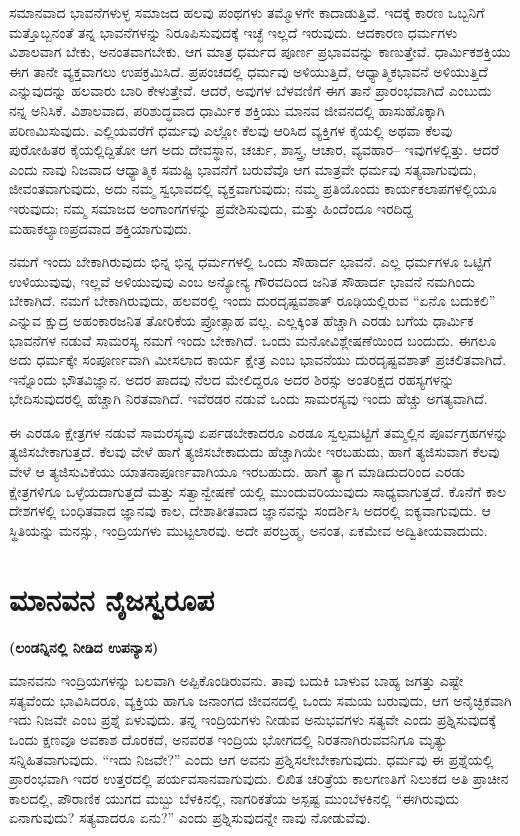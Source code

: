 ಸಮಾನವಾದ ಭಾವನೆಗಳುಳ್ಳ ಸಮಾಜದ ಹಲವು ಪಂಥಗಳು ತಮ್ಮೊಳಗೇ ಕಾದಾಡುತ್ತಿವೆ. ಇದಕ್ಕೆ ಕಾರಣ ಒಬ್ಬನಿಗೆ ಮತ್ತೊಬ್ಬನಂತೆ ತನ್ನ ಭಾವನೆಗಳನ್ನು ನಿರೂಪಿಸುವುದಕ್ಕೆ ಇಚ್ಛೆ ಇಲ್ಲದೆ ಇರುವುದು. ಆದಕಾರಣ ಧರ್ಮಗಳು ವಿಶಾಲವಾಗ ಬೇಕು, ಅನಂತವಾಗಬೇಕು. ಆಗ ಮಾತ್ರ ಧರ್ಮದ ಪೂರ್ಣ ಪ್ರಭಾವವನ್ನು ಕಾಣುತ್ತೇವೆ. ಧಾರ್ಮಿಕಶಕ್ತಿಯು ಈಗ ತಾನೇ ವ್ಯಕ್ತವಾಗಲು ಉಪಕ್ರಮಿಸಿದೆ. ಪ್ರಪಂಚದಲ್ಲಿ ಧರ್ಮವು ಅಳಿಯುತ್ತಿದೆ, ಆಧ್ಯಾತ್ಮಿಕಭಾವನೆ ಅಳಿಯುತ್ತಿದೆ ಎನ್ನುವುದನ್ನು ಹಲವಾರು ಬಾರಿ ಕೇಳುತ್ತೇವೆ. ಆದರೆ, ಅವುಗಳ ಬೆಳವಣಿಗೆ ಈಗ ತಾನೆ ಪ್ರಾರಂಭವಾಗಿದೆ ಎಂಬುದು ನನ್ನ ಅನಿಸಿಕೆ. ವಿಶಾಲವಾದ, ಪರಿಶುದ್ಧವಾದ ಧಾರ್ಮಿಕ ಶಕ್ತಿಯು ಮಾನವ ಜೀವನದಲ್ಲಿ ಹಾಸುಹೊಕ್ಕಾಗಿ ಪರಿಣಮಿಸುವುದು. ಎಲ್ಲಿಯವರೆಗೆ ಧರ್ಮವು ಎಲ್ಲೋ ಕೆಲವು ಆರಿಸಿದ ವ್ಯಕ್ತಿಗಳ ಕೈಯಲ್ಲಿ ಅಥವಾ ಕೆಲವು ಪುರೋಹಿತರ ಕೈಯಲ್ಲಿದ್ದಿತೋ ಆಗ ಅದು ದೇವಸ್ಥಾನ, ಚರ್ಚು, ಶಾಸ್ತ್ರ, ಆಚಾರ, ವ್ಯವಹಾರ– ಇವುಗಳಲ್ಲಿತ್ತು. ಆದರೆ ಎಂದು ನಾವು ನಿಜವಾದ ಆಧ್ಯಾತ್ಮಿಕ ಸಮಷ್ಟಿ ಭಾವನೆಗೆ ಬರುವೆವೊ ಆಗ ಮಾತ್ರವೇ ಧರ್ಮವು ಸತ್ಯವಾಗುವುದು, ಜೀವಂತವಾಗುವುದು, ಅದು ನಮ್ಮ ಸ್ವಭಾವದಲ್ಲಿ ವ್ಯಕ್ತವಾಗುವುದು; ನಮ್ಮ ಪ್ರತಿಯೊಂದು ಕಾರ್ಯಕಲಾಪಗಳಲ್ಲಿಯೂ ಇರುವುದು; ನಮ್ಮ ಸಮಾಜದ ಅಂಗಾಂಗಗಳನ್ನು ಪ್ರವೇಶಿಸುವುದು, ಮತ್ತು ಹಿಂದೆಂದೂ ಇರದಿದ್ದ ಮಹಾಕಲ್ಯಾಣಪ್ರದವಾದ ಶಕ್ತಿಯಾಗುವುದು.

ನಮಗೆ ಇಂದು ಬೇಕಾಗಿರುವುದು ಭಿನ್ನ ಭಿನ್ನ ಧರ್ಮಗಳಲ್ಲಿ ಒಂದು ಸೌಹಾರ್ದ ಭಾವನೆ. ಎಲ್ಲ ಧರ್ಮಗಳೂ ಒಟ್ಟಿಗೆ ಉಳಿಯುವುವು, ಇಲ್ಲವೆ ಅಳಿಯುವುವು ಎಂಬ ಅನ್ಯೋನ್ಯ ಗೌರವದಿಂದ ಜನಿತ ಸೌಹಾರ್ದ ಭಾವನೆ ನಮಗಿಂದು ಬೇಕಾಗಿದೆ. ನಮಗೆ ಬೇಕಾಗಿರುವುದು, ಹಲವರಲ್ಲಿ ಇಂದು ದುರದೃಷ್ಟವಶಾತ್​ ರೂಢಿಯಲ್ಲಿರುವ “ಏನೊ ಬದುಕಲಿ” ಎನ್ನುವ ಕ್ಷುದ್ರ ಅಹಂಕಾರಜನಿತ ತೋರಿಕೆಯ ಪ್ರೋತ್ಸಾಹ ವಲ್ಲ. ಎಲ್ಲಕ್ಕಿಂತ ಹೆಚ್ಚಾಗಿ ಎರಡು ಬಗೆಯ ಧಾರ್ಮಿಕ ಭಾವನೆಗಳ ನಡುವೆ ಸಾಮರಸ್ಯ ನಮಗೆ ಇಂದು ಬೇಕಾಗಿದೆ. ಒಂದು ಮನೋವಿಶ್ಲೇಷಣೆಯಿಂದ ಬಂದುದು. ಈಗಲೂ ಅದು ಧರ್ಮಕ್ಕೇ ಸಂಪೂರ್ಣವಾಗಿ ಮೀಸಲಾದ ಕಾರ್ಯ ಕ್ಷೇತ್ರ ಎಂಬ ಭಾವನೆಯು ದುರದೃಷ್ಟವಶಾತ್​ ಪ್ರಚಲಿತವಾಗಿದೆ. ಇನ್ನೊಂದು ಭೌತವಿಜ್ಞಾನ. ಅದರ ಪಾದವು ನೆಲದ ಮೇಲಿದ್ದರೂ ಅದರ ಶಿರಸ್ಸು ಅಂತರಿಕ್ಷದ ರಹಸ್ಯಗಳನ್ನು ಭೇದಿಸುವುದರಲ್ಲಿ ಹೆಚ್ಚಾಗಿ ನಿರತವಾಗಿದೆ. ಇವೆರಡರ ನಡುವೆ ಒಂದು ಸಾಮರಸ್ಯವು ಇಂದು ಹೆಚ್ಚು ಅಗತ್ಯವಾಗಿದೆ.

ಈ ಎರಡೂ ಕ್ಷೇತ್ರಗಳ ನಡುವೆ ಸಾಮರಸ್ಯವು ಏರ್ಪಡಬೇಕಾದರೂ ಎರಡೂ ಸ್ವಲ್ಪಮಟ್ಟಿಗೆ ತಮ್ಮಲ್ಲಿನ ಪೂರ್ವಗ್ರಹಗಳನ್ನು ತ್ಯಜಿಸಬೇಕಾಗುತ್ತದೆ. ಕೆಲವು ವೇಳೆ ಹಾಗೆ ತ್ಯಜಿಸಬೇಕಾದುದು ಹೆಚ್ಚಾಗಿಯೇ ಇರಬಹುದು, ಹಾಗೆ ತ್ಯಜಿಸುವಾಗ ಕೆಲವು ವೇಳೆ ಆ ತ್ಯಜಿಸುವಿಕೆಯು ಯಾತನಾಪೂರ್ಣವಾಗಿಯೂ ಇರಬಹುದು. ಹಾಗೆ ತ್ಯಾಗ ಮಾಡಿದುದರಿಂದ ಎರಡು ಕ್ಷೇತ್ರಗಳಿಗೂ ಒಳ್ಳೆಯದಾಗುತ್ತದೆ ಮತ್ತು ಸತ್ವಾನ್ವೇಷಣೆ ಯಲ್ಲಿ ಮುಂದುವರಿಯುವುದು ಸಾಧ್ಯವಾಗುತ್ತದೆ. ಕೊನೆಗೆ ಕಾಲ ದೇಶಗಳಲ್ಲಿ ಬಂಧಿತವಾದ ಜ್ಞಾನವು ಕಾಲ, ದೇಶಾತೀತವಾದ ಜ್ಞಾನವನ್ನು ಸಂದರ್ಶಿಸಿ ಅದರಲ್ಲಿ ಐಕ್ಯವಾಗುವುದು. ಆ ಸ್ಥಿತಿಯನ್ನು ಮನಸ್ಸು, ಇಂದ್ರಿಯಗಳು ಮುಟ್ಟಲಾರವು. ಅದೇ ಪರಬ್ರಹ್ಮ, ಅನಂತ, ಏಕಮೇವ ಅದ್ವಿತೀಯವಾದುದು.

\chapter{ಮಾನವನ ನೈಜಸ್ವರೂಪ}

\centerline{\textbf{(ಲಂಡನ್ನಿನಲ್ಲಿ ನೀಡಿದ ಉಪನ್ಯಾಸ)}}

ಮಾನವನು ಇಂದ್ರಿಯಗಳನ್ನು ಬಲವಾಗಿ ಅಪ್ಪಿಕೊಂಡಿರುವನು. ತಾವು ಬದುಕಿ ಬಾಳುವ ಬಾಹ್ಯ ಜಗತ್ತು ಎಷ್ಟೇ ಸತ್ಯವೆಂದು ಭಾವಿಸಿದರೂ, ವ್ಯಕ್ತಿಯ ಹಾಗೂ ಜನಾಂಗದ ಜೀವನದಲ್ಲಿ ಒಂದು ಸಮಯ ಬರುವುದು, ಆಗ ಅನೈಚ್ಛಿಕವಾಗಿ ಇದು ನಿಜವೇ ಎಂಬ ಪ್ರಶ್ನೆ ಏಳುವುದು. ತನ್ನ ಇಂದ್ರಿಯಗಳು ನೀಡುವ ಅನುಭವಗಳು ಸತ್ಯವೇ ಎಂದು ಪ್ರಶ್ನಿಸುವುದಕ್ಕೆ ಒಂದು ಕ್ಷಣವೂ ಅವಕಾಶ ದೊರಕದೆ, ಅನವರತ ಇಂದ್ರಿಯ ಭೋಗದಲ್ಲಿ ನಿರತನಾಗಿರುವವನಿಗೂ ಮೃತ್ಯು ಸನ್ನಿಹಿತವಾಗುವುದು. “ಇದು ನಿಜವೇ?” ಎಂದು ಆಗ ಅವನು ಪ್ರಶ್ನಿಸಲೇಬೇಕಾಗುವುದು. ಧರ್ಮವು ಈ ಪ್ರಶ್ನೆಯಲ್ಲಿ ಪ್ರಾರಂಭವಾಗಿ ಇದರ ಉತ್ತರದಲ್ಲಿ ಪರ್ಯವಸಾನವಾಗುವುದು. ಲಿಖಿತ ಚರಿತ್ರೆಯ ಕಾಲಗಣತಿಗೆ ನಿಲುಕದ ಅತಿ ಪ್ರಾಚೀನ ಕಾಲದಲ್ಲಿ, ಪೌರಾಣಿಕ ಯುಗದ ಮಬ್ಬು ಬೆಳಕಿನಲ್ಲಿ, ನಾಗರಿಕತೆಯ ಅಸ್ಪಷ್ಟ ಮುಂಬೆಳಕಿನಲ್ಲಿ “ಈಗಿರುವುದು ಏನಾಗುವುದು? ಸತ್ಯವಾದರೂ ಏನು?” ಎಂದು ಪ್ರಶ್ನಿಸುವುದನ್ನೇ ನಾವು ನೋಡುವೆವು.

